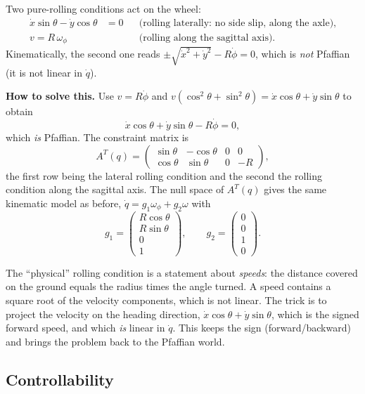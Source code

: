 \documentclass[11pt,a4paper]{article}
\def\bm#1{#1}%
\newcommand{\R}{\mathbb{R}}
\newcommand{\qv}{\bm{q}}
\theoremstyle{definition}
\theoremstyle{plain}
\theoremstyle{remark}
\begin{document}
Two pure-rolling conditions act on the wheel:
\begin{align*}
 \dot x\sin\theta-\dot y\cos\theta&=0 &&\text{(rolling laterally: no side slip, along the axle)},\\
 v=R\,\omega_\phi &&&\text{(rolling along the sagittal axis)}.
\end{align*}
Kinematically, the second one reads $\pm\sqrt{\dot x^2+\dot y^2}-R\dot\phi=0$, which is \emph{not} Pfaffian (it is not linear in $\dot{\qv}$).

\textbf{How to solve this.} Use $v=R\dot\phi$ and $v(\cos^2\theta+\sin^2\theta)=\dot x\cos\theta+\dot y\sin\theta$ to obtain
\[
 \dot x\cos\theta+\dot y\sin\theta-R\dot\phi=0 ,
\]
which \emph{is} Pfaffian. The constraint matrix is
\[
 A^T(\qv)=\begin{pmatrix}\sin\theta&-\cos\theta&0&0\\ \cos\theta&\sin\theta&0&-R\end{pmatrix},
\]
the first row being the lateral rolling condition and the second the rolling condition along the sagittal axis. The null space of $A^T(\qv)$ gives the same kinematic model as before, $\dot{\qv}=\bm g_1\omega_\phi+\bm g_2\omega$ with
\[
 \bm g_1=\begin{pmatrix}R\cos\theta\\R\sin\theta\\0\\1\end{pmatrix},\qquad
 \bm g_2=\begin{pmatrix}0\\0\\1\\0\end{pmatrix}.
\]

\begin{intuition}
The ``physical'' rolling condition is a statement about \emph{speeds}: the distance covered on the ground equals the radius times the angle turned. A speed contains a square root of the velocity components, which is not linear. The trick is to project the velocity on the heading direction, $\dot x\cos\theta+\dot y\sin\theta$, which is the signed forward speed, and which \emph{is} linear in $\dot{\qv}$. This keeps the sign (forward/backward) and brings the problem back to the Pfaffian world.
\end{intuition}

\subsection{Controllability}
\end{document}
